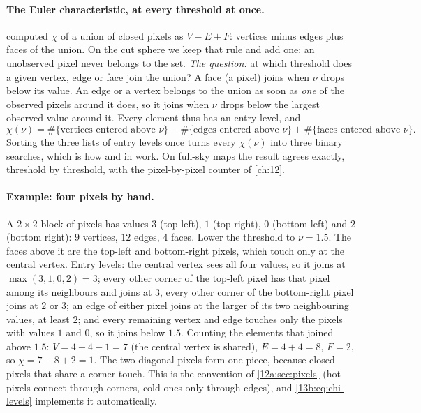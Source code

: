 \paragraph{The Euler characteristic, at every threshold at once.}  computed $\chi$ of a union of
closed pixels as $V-E+F$: vertices minus edges plus faces of the union. On the cut sphere we keep that rule and
add one: an unobserved pixel never belongs to the set. \emph{The question:} at which threshold does a given
vertex, edge or face join the union? A face (a pixel) joins when $\nu$ drops below its value. An edge or a vertex
belongs to the union as soon as \emph{one} of the observed pixels around it does, so it joins when $\nu$ drops
below the largest observed value around it. Every element thus has an entry level, and
\begin{equation}
  \chi(\nu)=\#\{\text{vertices entered above }\nu\}-\#\{\text{edges entered above }\nu\}+\#\{\text{faces entered above }\nu\}.
  \label{13b:eq:chi-levels}
\end{equation}
Sorting the three lists of entry levels once turns every $\chi(\nu)$ into three binary searches, which is how
 and  in  work. On full-sky
maps the result agrees exactly, threshold by threshold, with the pixel-by-pixel counter of \cref{ch:12}.

\paragraph{Example: four pixels by hand.} A $2\times2$ block of pixels has values $3$ (top left), $1$ (top right),
$0$ (bottom left) and $2$ (bottom right): $9$ vertices, $12$ edges, $4$ faces. Lower the threshold to $\nu=1.5$.
The faces above it are the top-left and bottom-right pixels, which touch only at the central vertex. Entry
levels: the central vertex sees all four values, so it joins at $\max(3,1,0,2)=3$; every other corner of the
top-left pixel has that pixel among its neighbours and joins at $3$, every other corner of the bottom-right pixel
joins at $2$ or $3$; an edge of either pixel joins at the larger of its two neighbouring values, at least $2$; and
every remaining vertex and edge touches only the pixels with values $1$ and $0$, so it joins below $1.5$. Counting
the elements that joined above $1.5$: $V=4+4-1=7$ (the central vertex is shared), $E=4+4=8$, $F=2$, so
$\chi=7-8+2=1$. The two diagonal pixels form one piece, because closed pixels that share a corner touch. This
is the convention of \cref{12a:sec:pixels} (hot pixels connect through corners, cold ones only through edges),
and \eqref{13b:eq:chi-levels} implements it automatically.

